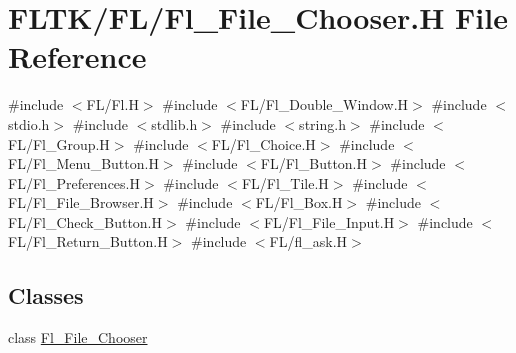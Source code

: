 \hypertarget{_fl___file___chooser_8_h}{}\section{F\+L\+T\+K/\+F\+L/\+Fl\+\_\+\+File\+\_\+\+Chooser.H File Reference}
\label{_fl___file___chooser_8_h}
{\ttfamily \#include $<$F\+L/\+Fl.\+H$>$}\newline
{\ttfamily \#include $<$F\+L/\+Fl\+\_\+\+Double\+\_\+\+Window.\+H$>$}\newline
{\ttfamily \#include $<$stdio.\+h$>$}\newline
{\ttfamily \#include $<$stdlib.\+h$>$}\newline
{\ttfamily \#include $<$string.\+h$>$}\newline
{\ttfamily \#include $<$F\+L/\+Fl\+\_\+\+Group.\+H$>$}\newline
{\ttfamily \#include $<$F\+L/\+Fl\+\_\+\+Choice.\+H$>$}\newline
{\ttfamily \#include $<$F\+L/\+Fl\+\_\+\+Menu\+\_\+\+Button.\+H$>$}\newline
{\ttfamily \#include $<$F\+L/\+Fl\+\_\+\+Button.\+H$>$}\newline
{\ttfamily \#include $<$F\+L/\+Fl\+\_\+\+Preferences.\+H$>$}\newline
{\ttfamily \#include $<$F\+L/\+Fl\+\_\+\+Tile.\+H$>$}\newline
{\ttfamily \#include $<$F\+L/\+Fl\+\_\+\+File\+\_\+\+Browser.\+H$>$}\newline
{\ttfamily \#include $<$F\+L/\+Fl\+\_\+\+Box.\+H$>$}\newline
{\ttfamily \#include $<$F\+L/\+Fl\+\_\+\+Check\+\_\+\+Button.\+H$>$}\newline
{\ttfamily \#include $<$F\+L/\+Fl\+\_\+\+File\+\_\+\+Input.\+H$>$}\newline
{\ttfamily \#include $<$F\+L/\+Fl\+\_\+\+Return\+\_\+\+Button.\+H$>$}\newline
{\ttfamily \#include $<$F\+L/fl\+\_\+ask.\+H$>$}\newline
\subsection*{Classes}
\begin{DoxyCompactItemize}
\item 
class \hyperlink{class_fl___file___chooser}{Fl\+\_\+\+File\+\_\+\+Chooser}
\end{DoxyCompactItemize}
